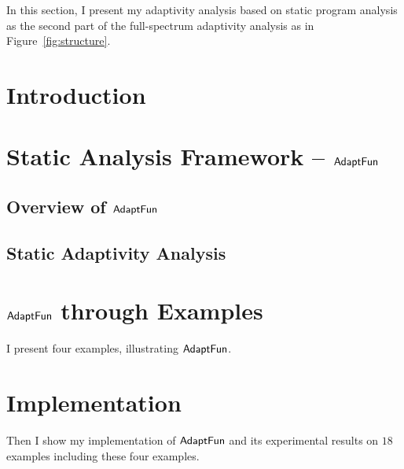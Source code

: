 In this section, I present my 
adaptivity analysis based on static program analysis as the second part of 
the full-spectrum adaptivity analysis as in Figure~\ref{fig:structure}. 
\section{Introduction}
\label{sec:static-intro}


\section{Static Analysis Framework -- $\textsf{AdaptFun}$}
\label{sec:static-adapfun}
% 

\subsection{Overview of $\textsf{AdaptFun}$}
\label{sec:static-overview}


% 

% 

\subsection{Static Adaptivity Analysis}
\label{subsec:static-adapt}


\section{$\textsf{AdaptFun}$ through Examples}
\label{sec:static-examples}
%
%
I present four examples, illustrating $\textsf{AdaptFun}$.
% 




% 
\section{Implementation}
\label{sec:static-implementation}
Then I show my implementation of $\textsf{AdaptFun}$ and its experimental results on $18$ examples including these four examples.

